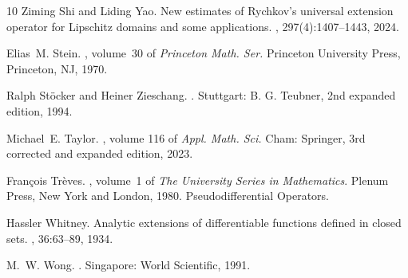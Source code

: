 \documentclass[10pt,a4paper]{amsart}
\theoremstyle{definition}
\theoremstyle{remark}
\numberwithin{equation}{section}
\begin{document}
\begin{thebibliography}{10}
Ziming Shi and Liding Yao.
\newblock New estimates of {Rychkov}'s universal extension operator for
  {Lipschitz} domains and some applications.
, 297(4):1407--1443, 2024.

Elias~M. Stein.
, volume~30 of {\em Princeton Math. Ser.}
\newblock Princeton University Press, Princeton, NJ, 1970.

Ralph St{\"o}cker and Heiner Zieschang.
.
\newblock Stuttgart: B. G. Teubner, 2nd expanded edition, 1994.

Michael~E. Taylor.
, volume 116 of {\em Appl. Math. Sci.}
\newblock Cham: Springer, 3rd corrected and expanded edition, 2023.

Fran{\c{c}}ois Tr{\`e}ves.
, volume~1 of {\em The University Series in Mathematics}.
\newblock Plenum Press, New York and London, 1980.
\newblock Pseudodifferential Operators.

Hassler Whitney.
\newblock Analytic extensions of differentiable functions defined in closed
  sets.
, 36:63--89, 1934.

M.~W. Wong.
.
\newblock Singapore: World Scientific, 1991.

\end{thebibliography}
 
\end{document}
